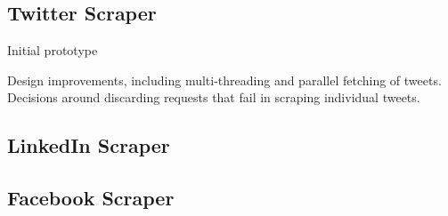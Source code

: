 \subsection{Twitter Scraper}


Initial prototype

Design improvements, including multi-threading and parallel fetching of tweets. Decisions around discarding requests that fail in scraping individual tweets. 

\subsection{LinkedIn Scraper}

\subsection{Facebook Scraper}








